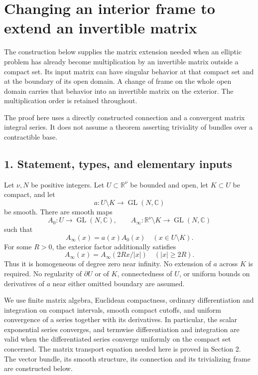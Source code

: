 \documentclass[
  11pt,
]{article}
\author{}
\date{}
\begin{document}
\section{Changing an interior frame to extend an invertible
matrix}\label{changing-an-interior-frame-to-extend-an-invertible-matrix}

The construction below supplies the matrix extension needed when an
elliptic problem has already become multiplication by an invertible
matrix outside a compact set. Its input matrix can have singular
behavior at that compact set and at the boundary of its open domain. A
change of frame on the whole open domain carries that behavior into an
invertible matrix on the exterior. The multiplication order is retained
throughout.

The proof here uses a directly constructed connection and a convergent
matrix integral series. It does not assume a theorem asserting
triviality of bundles over a contractible base.

\subsection{1. Statement, types, and elementary
inputs}\label{statement-types-and-elementary-inputs}

Let \(\nu,N\) be positive integers. Let \(U\subset\mathbb R^\nu\) be
bounded and open, let \(K\subset U\) be compact, and let \[
a:U\setminus K\longrightarrow \operatorname{GL}(N,\mathbb C)
\tag{M1}
\] be smooth. There are smooth maps \[
A_0:U\longrightarrow\operatorname{GL}(N,\mathbb C),
\qquad
A_\infty:\mathbb R^\nu\setminus K\longrightarrow
\operatorname{GL}(N,\mathbb C)
\tag{M2}
\] such that \[
A_\infty(x)=a(x)A_0(x)
\quad(x\in U\setminus K).
\tag{M3}
\] For some \(R>0\), the exterior factor additionally satisfies \[
A_\infty(x)=A_\infty(2R x/|x|)
\quad(|x|\geq2R).
\tag{M4}
\] Thus it is homogeneous of degree zero near infinity. No extension of
\(a\) across \(K\) is required. No regularity of \(\partial U\) or of
\(K\), connectedness of \(U\), or uniform bounds on derivatives of \(a\)
near either omitted boundary are assumed.

We use finite matrix algebra, Euclidean compactness, ordinary
differentiation and integration on compact intervals, smooth compact
cutoffs, and uniform convergence of a series together with its
derivatives. In particular, the scalar exponential series converges, and
termwise differentiation and integration are valid when the
differentiated series converge uniformly on the compact set concerned.
The matrix transport equation needed here is proved in Section 2. The
vector bundle, its smooth structure, its connection and its trivializing
frame are constructed below.
\end{document}
